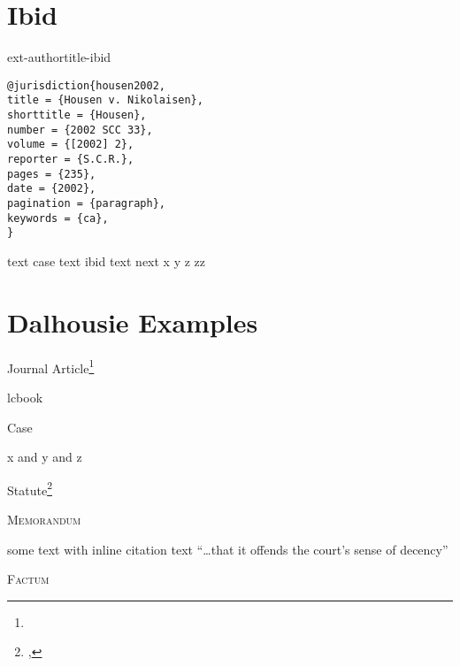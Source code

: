 



\section{Ibid}
ext-authortitle-ibid

\begin{verbatim}
@jurisdiction{housen2002,
title = {Housen v. Nikolaisen},
shorttitle = {Housen},
number = {2002 SCC 33},
volume = {[2002] 2},
reporter = {S.C.R.},
pages = {235},
date = {2002},
pagination = {paragraph},
keywords = {ca},
}

\end{verbatim}


text case text ibid text next
x
y
z
zz


\section{Dalhousie Examples}

Journal Article\footnote{}

lcbook

Case

x and y
 and z
 
Statute\footnote{, } 

\textsc{Memorandum} 

\medskip
some text with inline citation  text ``\ldots that it offends the court's sense of decency'' 

\bigskip
\textsc{Factum} 

